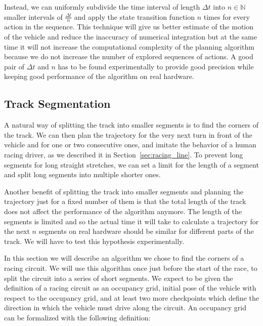 Instead, we can uniformly subdivide the time interval of length $\Delta t$ into $n\in\mathbb{N}$ smaller intervals of $\frac{\Delta t}{n}$ and apply the state transition function $n$ times for every action in the sequence. This technique will give us better estimate of the motion of the vehicle and reduce the inaccuracy of numerical integration but at the same time it will not increase the computational complexity of the planning algorithm because we do not increase the number of explored sequences of actions. A good pair of $\Delta t$ and $n$ has to be found experimentally to provide good precision while keeping good performance of the algorithm on real hardware.

\subsection{Track Segmentation}

A natural way of splitting the track into smaller segments is to find the corners of the track. We can then plan the trajectory for the very next turn in front of the vehicle and for one or two  consecutive ones, and imitate the behavior of a human racing driver, as we described it in Section~\ref{sec:racing_line}. To prevent long segments for long straight stretches, we can set a limit for the length of a segment and split long segments into multiple shorter ones.

Another benefit of splitting the track into smaller segments and planning the trajectory just for a fixed number of them is that the total length of the track does not affect the performance of the algorithm anymore. The length of the segments is limited and so the actual time it will take to calculate a trajectory for the next $n$ segments on real hardware should be similar for different parts of the track. We will have to test this hypothesis experimentally.

In this section we will describe an algorithm we chose to find the corners of a racing circuit. We will use this algorithm once just before the start of the race, to split the circuit into a series of short segments. We expect to be given the definition of a racing circuit as an occupancy grid, initial pose of the vehicle with respect to the occupancy grid, and at least two more checkpoints which define the direction in which the vehicle must drive along the circuit. An occupancy grid can be formalized with the following definition:

